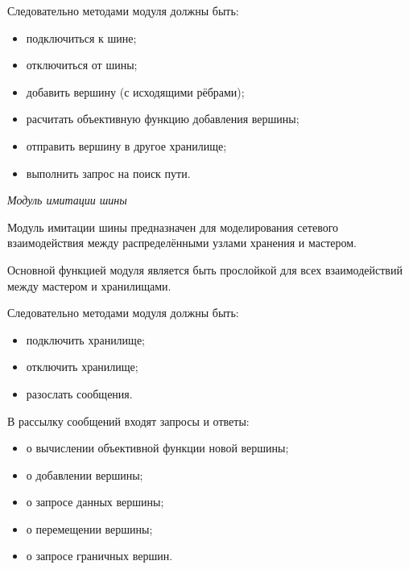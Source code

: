 Следовательно методами модуля должны быть:
\begin{itemize}
    \item подключиться к шине;
    \item отключиться от шины;
    \item добавить вершину (с исходящими рёбрами);
    \item расчитать объективную функцию добавления вершины;
    \item отправить вершину в другое хранилище;
    \item выполнить запрос на поиск пути.
\end{itemize}

\textit{Модуль имитации шины}

Модуль имитации шины предназначен для моделирования сетевого взаимодействия между распределёнными узлами хранения и мастером.

Основной функцией модуля является быть прослойкой для всех взаимодействий между мастером и хранилищами.

Следовательно методами модуля должны быть:
\begin{itemize}
    \item подключить хранилище;
    \item отключить  хранилище;
    \item разослать сообщения.
    
\end{itemize}

В рассылку сообщений входят запросы и ответы:
\begin{itemize}
    \item о вычислении объективной функции новой вершины;
    \item о добавлении вершины;
    \item о запросе данных вершины;
    \item о перемещении вершины;
    \item о запросе граничных вершин.
\end{itemize}
